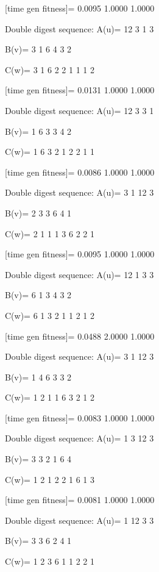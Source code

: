 [time gen fitness]=
    0.0095    1.0000    1.0000

Double digest sequence:
A(u)=
    12     3     1     3

B(v)=
     3     1     6     4     3     2

C(w)=
     3     1     6     2     2     1     1     1     2

[time gen fitness]=
    0.0131    1.0000    1.0000

Double digest sequence:
A(u)=
    12     3     3     1

B(v)=
     1     6     3     3     4     2

C(w)=
     1     6     3     2     1     2     2     1     1

[time gen fitness]=
    0.0086    1.0000    1.0000

Double digest sequence:
A(u)=
     3     1    12     3

B(v)=
     2     3     3     6     4     1

C(w)=
     2     1     1     1     3     6     2     2     1

[time gen fitness]=
    0.0095    1.0000    1.0000

Double digest sequence:
A(u)=
    12     1     3     3

B(v)=
     6     1     3     4     3     2

C(w)=
     6     1     3     2     1     1     2     1     2

[time gen fitness]=
    0.0488    2.0000    1.0000

Double digest sequence:
A(u)=
     3     1    12     3

B(v)=
     1     4     6     3     3     2

C(w)=
     1     2     1     1     6     3     2     1     2

[time gen fitness]=
    0.0083    1.0000    1.0000

Double digest sequence:
A(u)=
     1     3    12     3

B(v)=
     3     3     2     1     6     4

C(w)=
     1     2     1     2     2     1     6     1     3

[time gen fitness]=
    0.0081    1.0000    1.0000

Double digest sequence:
A(u)=
     1    12     3     3

B(v)=
     3     3     6     2     4     1

C(w)=
     1     2     3     6     1     1     2     2     1

